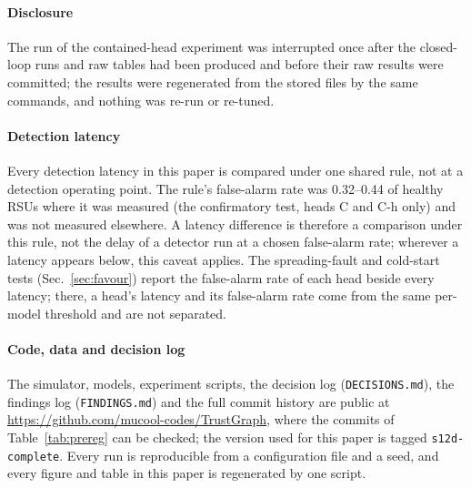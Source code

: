 \paragraph*{Disclosure}
The run of the contained-head experiment was interrupted once after the closed-loop runs and raw tables had been produced and before their raw results were committed; the results were regenerated from the stored files by the same commands, and nothing was re-run or re-tuned.

\paragraph*{Detection latency}
Every detection latency in this paper is compared under one shared rule, not at a detection operating point.
The rule's false-alarm rate was 0.32--0.44 of healthy RSUs where it was measured (the confirmatory test, heads C and C-h only) and was not measured elsewhere.
A latency difference is therefore a comparison under this rule, not the delay of a detector run at a chosen false-alarm rate; wherever a latency appears below, this caveat applies.
The spreading-fault and cold-start tests (Sec.~\ref{sec:favour}) report the false-alarm rate of each head beside every latency; there, a head's latency and its false-alarm rate come from the same per-model threshold and are not separated.

\paragraph*{Code, data and decision log}
The simulator, models, experiment scripts, the decision log (\texttt{DECISIONS.md}), the findings log (\texttt{FINDINGS.md}) and the full commit history are public at \url{https://github.com/mucool-codes/TrustGraph}, where the commits of Table~\ref{tab:prereg} can be checked; the version used for this paper is tagged \texttt{s12d-complete}.
Every run is reproducible from a configuration file and a seed, and every figure and table in this paper is regenerated by one script.
